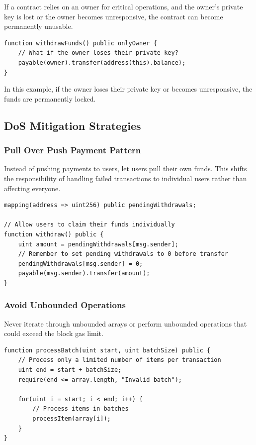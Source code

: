 \documentclass[12pt]{article}
\begin{document}
If a contract relies on an owner for critical operations, and the owner's private key is lost or the owner becomes unresponsive, the contract can become permanently unusable.

\begin{lstlisting}[language=Solidity, caption=Owner Operations DoS Example]
function withdrawFunds() public onlyOwner {
    // What if the owner loses their private key?
    payable(owner).transfer(address(this).balance);
}
\end{lstlisting}

\noindent
In this example, if the owner loses their private key or becomes unresponsive, the funds are permanently locked.

\subsection{DoS Mitigation Strategies}

\subsubsection*{Pull Over Push Payment Pattern}

Instead of pushing payments to users, let users pull their own funds. This shifts the responsibility of handling failed transactions to individual users rather than affecting everyone.

\begin{lstlisting}[language=Solidity, caption=Pull Over Push Example]
mapping(address => uint256) public pendingWithdrawals;

// Allow users to claim their funds individually
function withdraw() public {
    uint amount = pendingWithdrawals[msg.sender];
    // Remember to set pending withdrawals to 0 before transfer
    pendingWithdrawals[msg.sender] = 0;
    payable(msg.sender).transfer(amount);
}
\end{lstlisting}

\subsubsection*{Avoid Unbounded Operations}

Never iterate through unbounded arrays or perform unbounded operations that could exceed the block gas limit.

\begin{lstlisting}[language=Solidity, caption=Bounded Operations Example]
function processBatch(uint start, uint batchSize) public {
    // Process only a limited number of items per transaction
    uint end = start + batchSize;
    require(end <= array.length, "Invalid batch");
    
    for(uint i = start; i < end; i++) {
        // Process items in batches
        processItem(array[i]);
    }
}
\end{lstlisting}
\end{document}
